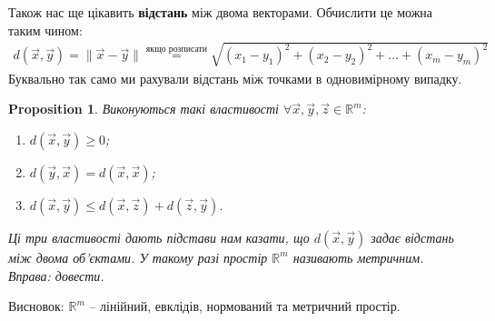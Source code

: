 \documentclass[a4paper, 10pt]{article}
\theoremstyle{theoremdd}
\theoremstyle{theoremdd}
\theoremstyle{theoremdd}
\theoremstyle{theoremdd}
\theoremstyle{theoremdd}
\theoremstyle{theoremdd}
\newtheorem{proposition}[theorem]{Proposition}
\theoremstyle{theoremdd}
\theoremstyle{theoremdd}
\theoremstyle{theoremdd}
\begin{document}
Також нас ще цікавить \textbf{відстань} між двома векторами. Обчислити це можна таким чином:
\begin{align*}
d(\vec{x},\vec{y}) = \| \vec{x} - \vec{y} \| \overset{\text{якщо розписати}}{=} \sqrt{(x_1-y_1)^2 + (x_2-y_2)^2 + \dots + (x_m-y_m)^2}
\end{align*}
Буквально так само ми рахували відстань між точками в одновимірному випадку.

\begin{proposition}
Виконуються такі властивості $\forall \vec{x},\vec{y},\vec{z} \in \mathbb{R}^m$:
\begin{enumerate}[nosep,wide=0pt,label={\arabic*)}]
\item $d(\vec{x},\vec{y}) \geq 0$;
\item $d(\vec{y},\vec{x}) = d(\vec{x},\vec{x})$;
\item $d(\vec{x},\vec{y}) \leq d(\vec{x},\vec{z}) + d(\vec{z},\vec{y})$.
\end{enumerate}
Ці три властивості дають підстави нам казати, що $d(\vec{x},\vec{y})$ задає відстань між двома об'єктами. У такому разі простір $\mathbb{R}^m$ називають метричним.\\
\textit{Вправа: довести.}
\end{proposition}
\noindent
Висновок: $\mathbb{R}^m$ -- лінійний, евклідів, нормований та метричний простір.
\end{document}
